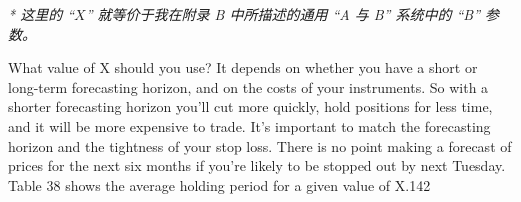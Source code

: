 \begin{chinesetableblock} 
\end{chinesetableblock}

\smallskip \noindent\textit{* 这里的 “\(X\)” 就等价于我在附录 B 中所描述的通用 “A 与 B” 系统中的 “B” 参数。}

\begin{englishblock} What value of X should you use? It depends on whether you have a short or long-term forecasting horizon, and on the costs of your instruments. So with a shorter forecasting horizon you’ll cut more quickly, hold positions for less time, and it will be more expensive to trade. It’s important to match the forecasting horizon and the tightness of your stop loss. There is no point making a forecast of prices for the next six months if you’re likely to be stopped out by next Tuesday. Table 38 shows the average holding period for a given value of X.142 \end{englishblock}

